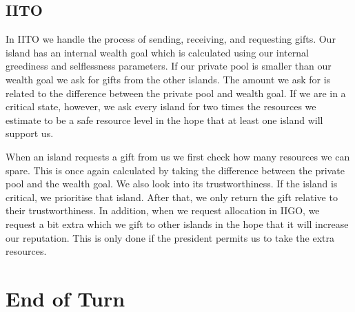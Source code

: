 \subsection{IITO}
In IITO we handle the process of sending, receiving, and requesting gifts.
Our island has an internal wealth goal which is calculated using our internal greediness and selflessness parameters. If our private pool is smaller than our wealth goal we ask for gifts from the other islands. The amount we ask for is related to the difference between the private pool and wealth goal. If we are in a critical state, however, we ask every island for two times the resources we estimate to be a safe resource level in the hope that at least one island will support us. 

When an island requests a gift from us we first check how many resources we can spare. This is once again calculated by taking the difference between the private pool and the wealth goal. We also look into its trustworthiness. If the island is critical, we prioritise that island. After that, we only return the gift relative to their trustworthiness. 
In addition, when we request allocation in IIGO, we request a bit extra which we gift to other islands in the hope that it will increase our reputation. This is only done if the president permits us to take the extra resources. 


 

\section{End of Turn}
